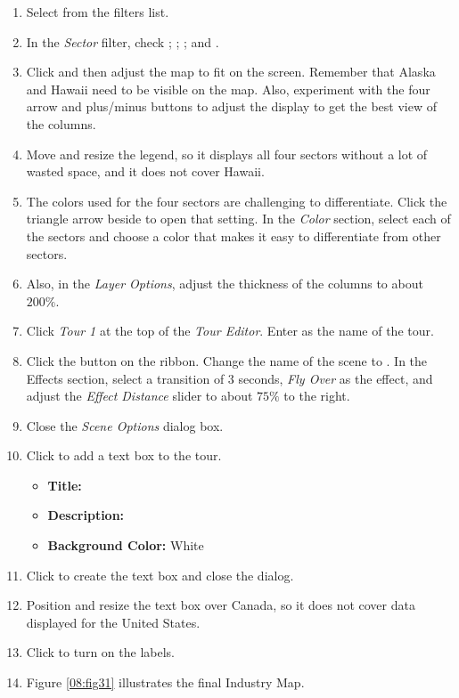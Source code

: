 \begin{enumbox}
\begin{enumerate}
		\item Select  from the filters list.
		\item In the \textit{Sector} filter, check ; ; ; and .
		\item Click  and then adjust the map to fit on the screen. Remember that Alaska and Hawaii need to be visible on the map. Also, experiment with the four arrow and plus/minus buttons to adjust the display to get the best view of the columns.
		\item Move and resize the legend, so it displays all four sectors without a lot of wasted space, and it does not cover Hawaii.
		\item The colors used for the four sectors are challenging to differentiate. Click the triangle arrow beside  to open that setting. In the \textit{Color} section, select each of the sectors and choose a color that makes it easy to differentiate from other sectors.
		\item Also, in the \textit{Layer Options}, adjust the thickness of the columns to about $ 200\% $.
		\item Click \textit{Tour 1} at the top of the \textit{Tour Editor}. Enter  as the name of the tour. 
		\item Click the  button on the ribbon. Change the name of the scene to . In the Effects section, select a transition of $ 3 $ seconds, \textit{Fly Over} as the effect, and adjust the \textit{Effect Distance} slider to about $ 75\% $ to the right.
		\item Close the \textit{Scene Options} dialog box.
		\item Click  to add a text box to the tour. 
		
		\begin{itemize}
			\item \textbf{Title:} 
			\item \textbf{Description:} 
			\item \textbf{Background Color:} White
		\end{itemize}
		
		\item Click  to create the text box and close the dialog.
		\item Position and resize the text box over Canada, so it does not cover data displayed for the United States.
		\item Click  to turn on the labels.
		\item Figure \ref{08:fig31} illustrates the final Industry Map.
		

\end{enumerate}
\end{enumbox}
